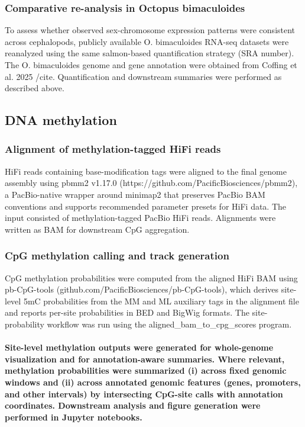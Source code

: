 \documentclass[11pt]{article}
\begin{document}
\subsubsection{Comparative re-analysis in Octopus bimaculoides}
To assess whether observed sex-chromosome expression patterns were consistent across cephalopods, publicly available O. bimaculoides RNA-seq datasets were reanalyzed using the same salmon-based quantification strategy (SRA number). The O. bimaculoides genome and gene annotation were obtained from Coffing et al. 2025 /cite. Quantification and downstream summaries were performed as described above.

\subsection{DNA methylation }

\subsubsection{Alignment of methylation-tagged HiFi reads}

HiFi reads containing base-modification tags were aligned to the final genome assembly using pbmm2 v1.17.0 (https://github.com/PacificBiosciences/pbmm2), a PacBio-native wrapper around minimap2 that preserves PacBio BAM conventions and supports recommended parameter presets for HiFi data. The input consisted of methylation-tagged PacBio HiFi reads. Alignments were written as BAM for downstream CpG aggregation.

\subsubsection{CpG methylation calling and track generation}

CpG methylation probabilities were computed from the aligned HiFi BAM using pb-CpG-tools (github.com/PacificBiosciences/pb-CpG-tools), which derives site-level 5mC probabilities from the MM and ML auxiliary tags in the alignment file and reports per-site probabilities in BED and BigWig formats. The site-probability workflow was run using the aligned\_bam\_to\_cpg\_scores program. 

\paragraph{Site-level methylation outputs were generated for whole-genome visualization and for annotation-aware summaries. Where relevant, methylation probabilities were summarized (i) across fixed genomic windows and (ii) across annotated genomic features (genes, promoters, and other intervals) by intersecting CpG-site calls with annotation coordinates. Downstream analysis and figure generation were performed in Jupyter notebooks.}
\end{document}

